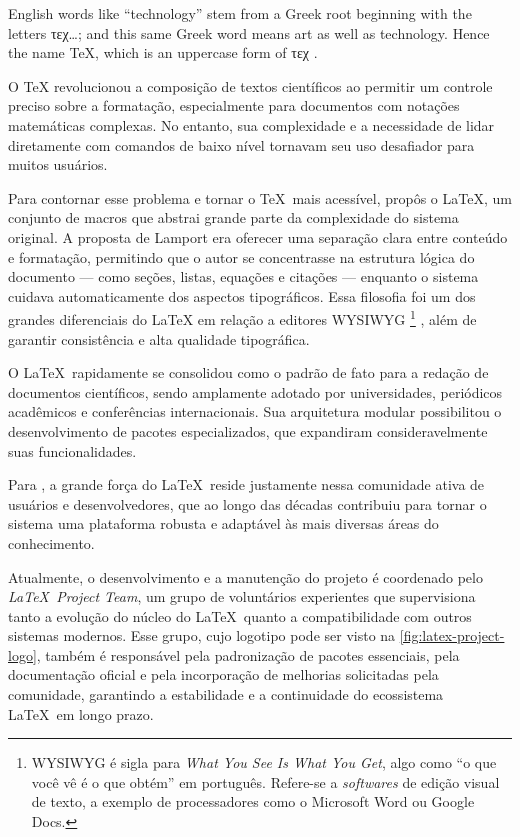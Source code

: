\begin{citacao}[english]
English words like ``technology'' stem from a Greek root beginning with the letters \foreignlanguage{greek}{τεχ}\ldots; and this same Greek word means art as well as technology. Hence the name \TeX, which is an uppercase form of \foreignlanguage{greek}{τεχ} \cite{Knuth1984}.
\end{citacao}

O \TeX{} revolucionou a composição de textos científicos ao permitir um controle preciso sobre a formatação, especialmente para documentos com notações matemáticas complexas. No entanto, sua complexidade e a necessidade de lidar diretamente com comandos de baixo nível tornavam seu uso desafiador para muitos usuários.

Para contornar esse problema e tornar o \TeX\ mais acessível, \textcite{Lamport1994} propôs o \LaTeX, um conjunto de macros que abstrai grande parte da complexidade do sistema original. A proposta de Lamport era oferecer uma separação clara entre conteúdo e formatação, permitindo que o autor se concentrasse na estrutura lógica do documento --- como seções, listas, equações e citações --- enquanto o sistema cuidava automaticamente dos aspectos tipográficos. Essa filosofia foi um dos grandes diferenciais do \LaTeX{} em relação a editores WYSIWYG%
\footnote{WYSIWYG é sigla para \emph{\foreignlanguage{english}{What You See Is What You Get}}, algo como ``o que você vê é o que obtém'' em português. Refere-se a \emph{softwares} de edição visual de texto, a exemplo de processadores como o Microsoft Word ou Google Docs.}%
, além de garantir consistência e alta qualidade tipográfica.

O \LaTeX\ rapidamente se consolidou como o padrão de fato para a redação de documentos científicos, sendo amplamente adotado por universidades, periódicos acadêmicos e conferências internacionais. Sua arquitetura modular possibilitou o desenvolvimento de pacotes especializados, que expandiram consideravelmente suas funcionalidades.

Para \textcite{Mittelbach2004}, a grande força do \LaTeX\ reside justamente nessa comunidade ativa de usuários e desenvolvedores, que ao longo das décadas contribuiu para tornar o sistema uma plataforma robusta e adaptável às mais diversas áreas do conhecimento.

Atualmente, o desenvolvimento e a manutenção do projeto é coordenado pelo \textit{\LaTeX\ Project Team}, um grupo de voluntários experientes que supervisiona tanto a evolução do núcleo do \LaTeX\ quanto a compatibilidade com outros sistemas modernos. Esse grupo, cujo logotipo pode ser visto na \autoref{fig:latex-project-logo}, também é responsável pela padronização de pacotes essenciais, pela documentação oficial e pela incorporação de melhorias solicitadas pela comunidade, garantindo a estabilidade e a continuidade do ecossistema \LaTeX\ em longo prazo.

